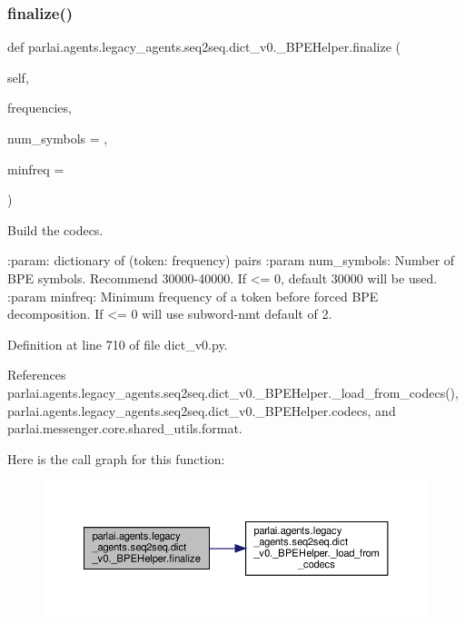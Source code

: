 \subsubsection{\texorpdfstring{finalize()}{finalize()}}
{\footnotesize\ttfamily def parlai.\+agents.\+legacy\+\_\+agents.\+seq2seq.\+dict\+\_\+v0.\+\_\+\+B\+P\+E\+Helper.\+finalize (\begin{DoxyParamCaption}\item[{}]{self,  }\item[{}]{frequencies,  }\item[{}]{num\+\_\+symbols = {},  }\item[{}]{minfreq = {} }\end{DoxyParamCaption})}

\begin{DoxyVerb}Build the codecs.

:param: dictionary of (token: frequency) pairs
:param num_symbols: Number of BPE symbols. Recommend 30000-40000.
    If <= 0, default 30000 will be used.
:param minfreq: Minimum frequency of a token before forced BPE
    decomposition. If <= 0 will use subword-nmt default of 2.
\end{DoxyVerb}
 

Definition at line 710 of file dict\+\_\+v0.\+py.



References parlai.\+agents.\+legacy\+\_\+agents.\+seq2seq.\+dict\+\_\+v0.\+\_\+\+B\+P\+E\+Helper.\+\_\+load\+\_\+from\+\_\+codecs(), parlai.\+agents.\+legacy\+\_\+agents.\+seq2seq.\+dict\+\_\+v0.\+\_\+\+B\+P\+E\+Helper.\+codecs, and parlai.\+messenger.\+core.\+shared\+\_\+utils.\+format.

Here is the call graph for this function\+:
\nopagebreak
\begin{figure}[H]
\begin{center}
\leavevmode
\includegraphics[width=350pt]{classparlai_1_1agents_1_1legacy__agents_1_1seq2seq_1_1dict__v0_1_1__BPEHelper_a9a5b899a899872f36079d4a7b9dc8ae4_cgraph}
\end{center}
\end{figure}
\mbox{\label{classparlai_1_1agents_1_1legacy__agents_1_1seq2seq_1_1dict__v0_1_1__BPEHelper_a33d5217e263257279fe081b02da95d8d}} 
